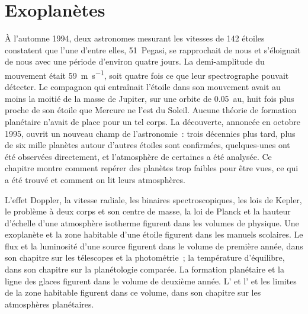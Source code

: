 \chapter{Exoplanètes}\label{ch:b3:exoplanets}

À l'automne 1994, deux astronomes mesurant les vitesses de 142
étoiles constatent que l'une d'entre elles, 51~Pegasi, se rapprochait de nous et s'éloignait
de nous avec une période d'environ quatre jours. La demi-amplitude du mouvement était
\qty{59}{m.s^{-1}}, soit quatre fois ce que leur spectrographe pouvait détecter. Le
compagnon qui entraînait l'étoile dans son mouvement avait au moins la moitié de la masse de
Jupiter, sur une orbite de \qty{0.05}{au}, huit fois plus proche de son étoile
que Mercure ne l'est du Soleil. Aucune théorie de formation planétaire n'avait de place
pour un tel corps. La découverte, annoncée en octobre 1995, ouvrit un nouveau champ
de l'astronomie~: trois décennies plus tard, plus de six mille planètes autour
d'autres étoiles sont confirmées, quelques-unes ont été observées directement, et
l'atmosphère de certaines a été analysée. Ce chapitre montre comment repérer des planètes trop
faibles pour être vues, ce qui a été trouvé et comment on lit
leurs atmosphères.

\begin{recall}
L'effet Doppler, la vitesse radiale, les binaires spectroscopiques, les lois de
Kepler, le problème à deux corps et son centre de masse, la loi de Planck et la
hauteur d'échelle d'une atmosphère isotherme figurent dans les volumes de physique. Une
exoplanète et la zone habitable d'une étoile figurent dans les manuels scolaires. Le
flux et la luminosité d'une source figurent dans le volume de première année, dans son
chapitre sur les télescopes et la photométrie~; la température d'équilibre, dans son
chapitre sur la planétologie comparée. La formation planétaire et la ligne des glaces
figurent dans le volume de deuxième année. L' et l' et les limites de la zone habitable figurent dans ce volume, dans son
chapitre sur les atmosphères planétaires.
\end{recall}

